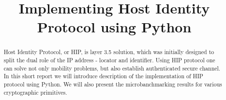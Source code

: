 \documentclass[conference,10pt,letter]{IEEEtran}
\begin{document}
\sloppy
\title{Implementing Host Identity Protocol using Python}
\maketitle
\begin{abstract}
Host Identity Protocol, or HIP, is layer 3.5 solution,
which was initially designed to split the dual role of
the IP address - locator and identifier. Using HIP protocol
one can solve not only mobility problems, but also 
establish authenticated secure channel. In this short 
report we will introduce description of the implementation
of HIP protocol using Python. We will also present the 
microbanchmarking results for various cryptographic 
primitives.
\end{abstract}







\end{document}
